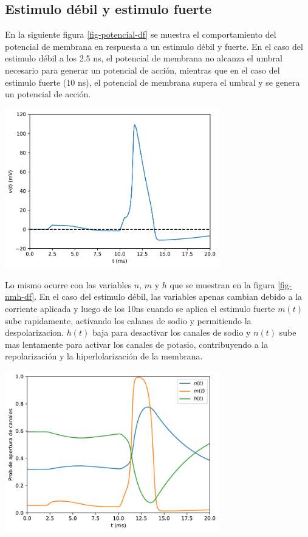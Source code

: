 \documentclass[aps,prl,reprint,groupedaddress]{revtex4-2}
\newenvironment{Figura}
  {\par\medskip\noindent\minipage{\linewidth}}
  {\endminipage\par\medskip}
\begin{document}
\subsection{Estimulo débil y estimulo fuerte}

En la siguiente figura \ref{fig-potencial-df} se muestra el comportamiento del
potencial de membrana en respuesta a un estimulo débil y fuerte. En el caso del 
estimulo débil a los 2.5 ns, el potencial de membrana no alcanza el umbral 
necesario para generar un potencial de acción, mientras que en el caso del 
estimulo fuerte (10 ns), el potencial de membrana supera el umbral y se genera un 
potencial de acción.
\begin{Figura}
    \centering
    \includegraphics[width=0.7\textwidth]{figs/potencial_mem_estimulo_d_f.pdf}
    \label{fig-potencial-df}
\end{Figura}

Lo mismo ocurre con las variables $n$, $m$ y $h$ que se muestran en la figura 
\ref{fig-nmh-df}. En el caso del estimulo débil, las variables apenas cambian 
debido a la corriente aplicada y luego de los 10ns cuando se aplica el estimulo
fuerte $m(t)$ sube rapidamente, activando los calanes de sodio y permitiendo la 
despolarizacion. $h(t)$ baja para desactivar los canales de sodio y $n(t)$ sube
mas lentamente para activar los canales de potasio, contribuyendo a la repolarización 
y la hiperlolarización de la membrana.
\begin{Figura}
    \centering
    \includegraphics[width=0.7\textwidth]{figs/nmh_estimulo_d_f.pdf}
    \label{fig-nmh-df}
\end{Figura}
\end{document}
